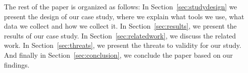 The rest of the paper is organized as follows: In Section~\ref{sec:studydesign} we present the design of our case study, where we explain what tools we use, what data we collect and how we collect it. In Section~\ref{sec:results}, we present the results of our case study. In Section~\ref{sec:relatedwork}, we discuss the related work. In Section~\ref{sec:threats}, we present the threats to validity for our study. And finally in Section~\ref{sec:conclusion}, we conclude the paper based on our findings. 











